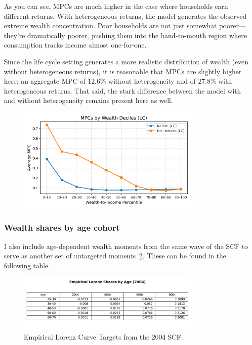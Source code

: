 \par As you can see, MPCs are much higher in the case where households earn different returns. With heterogeneous returns, the model generates the observed extreme wealth concentration. Poor households are not just somewhat poorer—they're dramatically poorer, pushing them into the hand-to-mouth region where consumption tracks income almost one-for-one.

\par Since the life cycle setting generates a more realistic distribution of wealth (even without heterogeneous returns), it is reasonable that MPCs are slightly higher here: an aggregate MPC of $12.6\%$ without heterogeneity and of $27.8\%$ with heterogeneous returns. That said, the stark difference between the model with and without heterogeneity remains present here as well.

\begin{figure}[htbp]
\centering
\includegraphics[width=0.8\textwidth]{Tables/LC_MPC_by_WealthDecile_compare.png}
\label{fig:LCMPCWealthDecileCompare}
\end{figure}


\subsubsection{Wealth shares by age cohort}

\par  I also include age-dependent wealth moments from the same wave of the SCF to serve as another set of untargeted moments~\ref{fig:EmpLorenzTar}. These can be found in the following table.

\begin{figure}[h]
\centering
\includegraphics[width=0.8\textwidth]{Tables/Emp_Lorenz_by_age_2004.png}
\caption{Empirical Lorenz Curve Targets from the 2004 SCF.}
\label{fig:EmpLorenzTar}
\end{figure}

